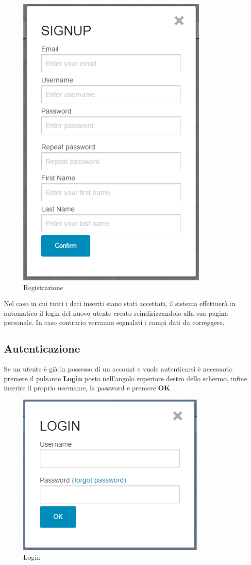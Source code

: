\begin{figure}[h] 
	\centering 
	\includegraphics[scale=0.40] {img/signup.png}
	\caption{Registrazione} 
\end{figure}

\noindent Nel caso in cui tutti i dati inseriti siano stati accettati, il sistema effettuerà in automatico il login del nuovo utente creato reindirizzandolo alla sua pagina personale.
In caso contrario verranno segnalati i campi dati da correggere.

\subsection{Autenticazione}
Se un utente è già in possesso di un account e vuole autenticarsi è necessario premere il pulsante \textbf{Login} posto nell'angolo superiore destro dello schermo, infine inserire il proprio username, la password e premere \textbf{OK}.

\begin{figure}[h] 
	\centering 
	\includegraphics[scale=0.40] {img/login.png}
	\caption{Login} 
\end{figure}

